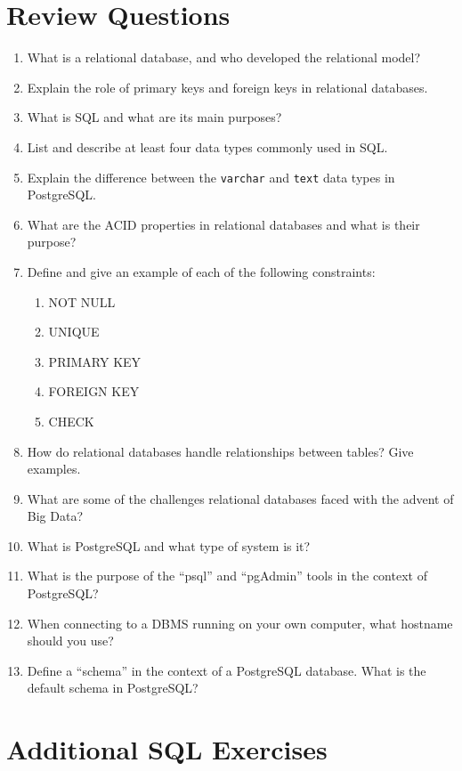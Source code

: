 \section{Review Questions}

\begin{enumerate}[nosep]
	\item What is a relational database, and who developed the relational model?
	\item Explain the role of primary keys and foreign keys in relational databases.
	\item What is SQL and what are its main purposes?
	\item List and describe at least four data types commonly used in SQL.
	\item Explain the difference between the \texttt{varchar} and \texttt{text} data types in PostgreSQL.
	\item What are the ACID properties in relational databases and what is their purpose?
	\item Define and give an example of each of the following constraints:
	\begin{enumerate}[label=\Alph*.]
		\item NOT NULL
		\item UNIQUE
		\item PRIMARY KEY
		\item FOREIGN KEY
		\item CHECK
	\end{enumerate}
	\item How do relational databases handle relationships between tables? Give examples.
	\item What are some of the challenges relational databases faced with the advent of Big Data?
    \item What is PostgreSQL and what type of system is it?
    \item What is the purpose of the ``psql'' and ``pgAdmin'' tools in the context of PostgreSQL?
    \item When connecting to a DBMS running on your own computer, what hostname should you use?
    \item Define a ``schema'' in the context of a PostgreSQL database. What is the default schema in PostgreSQL?
\end{enumerate}

    
\section{Additional SQL Exercises}

